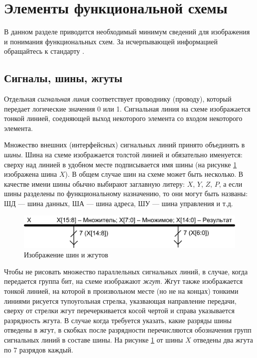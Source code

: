 \section{Элементы функциональной схемы}
\label{s::ch::practice::elements}

В данном разделе приводится необходимый минимум сведений для изображения и понимания функциональных схем. За исчерпывающей информацией обращайтесь к стандарту \cite{bib:gost:fs}.


\subsection{Сигналы, шины, жгуты}


Отдельная \emph{сигнальная линия} соответствует проводнику (проводу), который передает логические значения 0 или 1. Сигнальная линия на схеме изображается тонкой линией, соедняющей выход некоторого элемента со входом некоторого элемента. 

Множество внешних (интерфейсных) сигнальных линий принято объединять в \emph{шины}. Шина на схеме изображается толстой линией и обязательно именуется: сверху над линией в удобном месте подписывается имя шины (на рисунке \ref{fig::ch::practice::bus} изображена шина $X$). В общем случае шин на схеме может быть несколько. В качестве имени шины обычно выбирают заглавную литеру: $X$, $Y$, $Z$, $P$, а если шины разделены по функциональному назначению, то они могут быть названы: ШД --- шина данных, ША --- шина адреса, ШУ --- шина управления и т.д.

\begin{figure}[!ht]
    \centering
    \includegraphics{fig/bus}
    \caption{Изображение шин и жгутов}
    \label{fig::ch::practice::bus}
\end{figure}

Чтобы не рисовать множество параллельных сигнальных линий, в случае, когда передается группа бит, на схеме изображают \emph{жгут}. Жгут также изображается тонкой линией, на которой в произвольном месте (но не на концах) тонкими линиями рисуется тупоугольная стрелка, указвающая направление передачи, сверху от стрелки жгут перечеркивается косой чертой и справа указывается разрядность жгута. В случае когда требуется указать, какие разряды шины отведены в жгут, в скобках после разрядности перечисляются обозначения групп сигнальных линий в составе шины. На рисунке \ref{fig::ch::practice::bus} от шины $X$ отведены два жгута по $7$ разрядов каждый.

